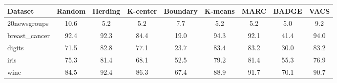 \begin{tabular}{lcccccccc}
\toprule
Dataset & Random & Herding & K-center & Boundary & K-means & MARC & BADGE & VACS \\
\midrule
20newsgroups & 10.6 & 5.2 & 5.2 & 7.7 & 5.2 & 5.2 & 5.0 & 9.2 \\
breast\_cancer & 92.4 & 92.3 & 84.4 & 19.0 & 94.3 & 92.1 & 41.4 & 94.0 \\
digits & 71.5 & 82.8 & 77.1 & 23.7 & 83.4 & 83.2 & 30.0 & 83.2 \\
iris & 75.3 & 81.4 & 68.1 & 52.5 & 79.2 & 81.4 & 55.3 & 76.9 \\
wine & 84.5 & 92.4 & 86.3 & 67.4 & 88.9 & 91.7 & 70.1 & 90.7 \\
\bottomrule
\end{tabular}
